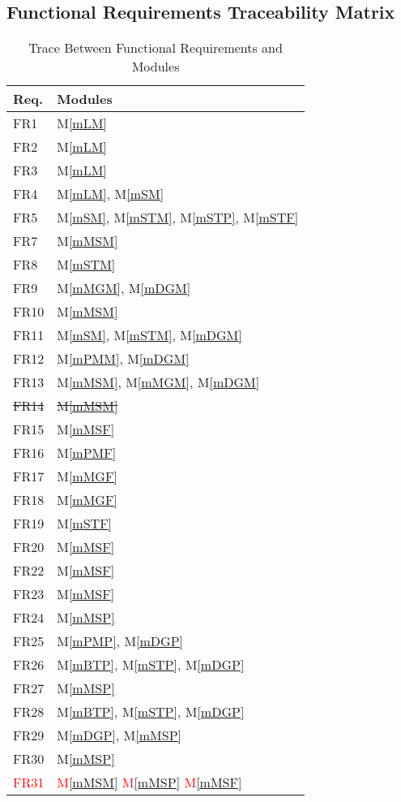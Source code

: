 \documentclass[12pt, titlepage]{article}
\newcommand{\mref}[1]{M\ref{#1}}
\begin{document}
\subsection{Functional Requirements Traceability Matrix}
\begin{table}[H]
\centering
\begin{tabular}{p{} p{}}
\toprule
\textbf{Req.} & \textbf{Modules}\\
\midrule
FR1 & \mref{mLM}\\
FR2 & \mref{mLM}\\
FR3 & \mref{mLM}\\
FR4 & \mref{mLM}, \mref{mSM}\\ 
FR5 & \mref{mSM}, \mref{mSTM}, \mref{mSTP}, \mref{mSTF}\\
FR7 & \mref{mMSM}\\ 
FR8 & \mref{mSTM}\\
FR9 & \mref{mMGM}, \mref{mDGM}\\
FR10 & \mref{mMSM}\\
FR11 & \mref{mSM}, \mref{mSTM}, \mref{mDGM}\\
FR12 & \mref{mPMM}, \mref{mDGM}\\
FR13 & \mref{mMSM}, \mref{mMGM}, \mref{mDGM}\\
\sout{FR14} & \sout{\mref{mMSM}}\\ 
FR15 & \mref{mMSF}\\
FR16 & \mref{mPMF}\\
FR17 & \mref{mMGF} \\
FR18 & \mref{mMGF}\\
FR19 & \mref{mSTF}\\
FR20 & \mref{mMSF}\\
FR22 & \mref{mMSF}\\
FR23 & \mref{mMSF}\\
FR24 & \mref{mMSP}\\ 
FR25 & \mref{mPMP}, \mref{mDGP}\\
FR26 & \mref{mBTP}, \mref{mSTP}, \mref{mDGP}\\
FR27 & \mref{mMSP}\\ 
FR28 & \mref{mBTP}, \mref{mSTP}, \mref{mDGP}\\
FR29 & \mref{mDGP}, \mref{mMSP}\\
FR30 & \mref{mMSP}\\
\textcolor{red}{FR31} & \textcolor{red}{\mref{mMSM} \mref{mMSP} \mref{mMSF}}\\
\bottomrule
\end{tabular}
\caption{Trace Between Functional Requirements and Modules}
\label{TblFRT}
\end{table}
\end{document}
